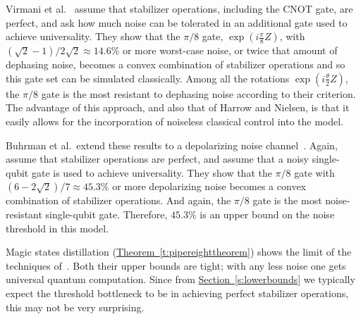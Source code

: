 \documentclass[11pt]{article}
\theoremstyle{note}
\newcommand{\thmref}[1]{\hyperref[#1]{{Theorem~\ref*{#1}}}}
\newcommand{\secref}[1]{\hyperref[#1]{{Section~\ref*{#1}}}}
\begin{document}
Virmani et al.~\cite{VirmaniHuelgaPlenio} assume that stabilizer operations, including the CNOT gate, are perfect, and ask how much noise can be tolerated in an additional gate used to achieve universality.  They show that the $\pi/8$ gate, $\exp(i \tfrac{\pi}{8}Z)$, with $(\sqrt{2}-1)/2\sqrt{2} \approx 14.6\%$ or more worst-case noise, or twice that amount of dephasing noise, becomes a convex combination of stabilizer operations and so this gate set can be simulated classically.  Among all the rotations $\exp(i \tfrac{\theta}{2}Z)$, the $\pi/8$ gate is the most resistant to dephasing noise according to their criterion.  The advantage of this approach, and also that of Harrow and Nielsen, is that it easily allows for the incorporation of noiseless classical control into the model.  

Buhrman et al.~extend these results to a depolarizing noise channel~\cite{BuhrmanCleveLaurentLindenSchrijverUnger06}.  Again, assume that stabilizer operations are perfect, and assume that a noisy single-qubit gate is used to achieve universality.  They show that the $\pi/8$ gate with $(6 - 2 \sqrt 2)/7 \approx 45.3\%$ or more depolarizing noise becomes a convex combination of stabilizer operations.  And again, the $\pi/8$ gate is the most noise-resistant single-qubit gate.  Therefore, $45.3\%$ is an upper bound on the noise threshold in this model.  

Magic states distillation (\thmref{t:pipereighttheorem}) shows the limit of the techniques of~\cite{VirmaniHuelgaPlenio, BuhrmanCleveLaurentLindenSchrijverUnger06}.  Both their upper bounds are tight; with any less noise one gets universal quantum computation.  Since from \secref{s:lowerbounds} we typically expect the threshold bottleneck to be in achieving perfect stabilizer operations, this may not be very surprising.  
\end{document}
